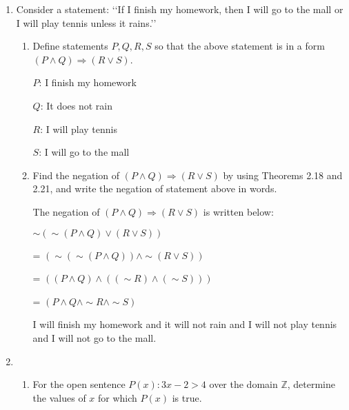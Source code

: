 \documentclass[10pt]{article} %
\newcommand{\Z}{\mathbb{Z}}
\begin{document}
\begin{enumerate}
 \item Consider a statement: \lq\lq If I finish my homework, then I will go to the mall or I will play tennis unless it rains.\rq\rq
     \begin{enumerate}
       \item Define statements $P,Q,R,S$ so that the above statement is in a form $(P \wedge Q) \Rightarrow (R \vee S)$.
       
       \bigskip
       
       
       $P$: I finish my homework
       
       $Q$: It does not rain
       
       $R$: I will play tennis
       
       $S$: I will go to the mall
       
       \bigskip
       
       \item Find the negation of $(P \wedge Q) \Rightarrow (R \vee S)$ by using Theorems 2.18 and 2.21, and write the negation of statement above in words.
       
       \bigskip
       
         The negation of $(P \wedge Q) \Rightarrow (R \vee S)$ is written below:
       \begin{center} $\sim(\sim(P \wedge Q) \vee (R \vee S))$ \end{center}
       \begin{center} = $(\sim(\sim(P \wedge Q)) \wedge \sim(R \vee S))$ \end{center}
       \begin{center} = $((P \wedge Q) \wedge ((\sim R) \wedge (\sim S)))$ \end{center}
       \begin{center} = $(P \wedge Q \wedge \sim R \wedge \sim S)$ \end{center}
       \begin{center} I will finish my homework and it will not rain and I will not play tennis and I will not go to the mall.  \end{center}
       
       \bigskip
       
     \end{enumerate}

 \item
\begin{enumerate}
 \item For the open sentence $P(x): 3x-2>4$ over the domain $\Z$, determine the values of $x$ for which $P(x)$ is true.
 

\end{enumerate}
\end{enumerate}
\end{document}
